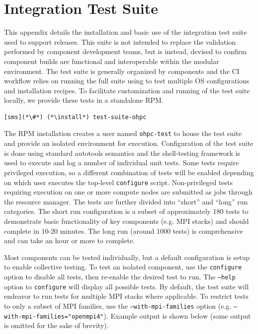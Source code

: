 \clearpage
\section{Integration Test Suite}  \label{appendix:test_suite}

This appendix details the installation and basic use of the integration test
suite used to support \OHPC{} releases. This suite is not intended to replace
the validation performed by component development teams, but is instead,
devised to confirm component builds are functional and interoperable within
the modular \OHPC{} environment.
The test suite is generally organized by components and the \OHPC{} CI workflow
relies on running the full suite using \href{https://jenkins.io}{\color{blue}{Jenkins}} to test
multiple OS configurations and installation recipes.
To facilitate customization and running of the test suite locally, we
provide these tests in a standalone RPM.

\begin{lstlisting}
[sms](*\#*) (*\install*) test-suite-ohpc
\end{lstlisting}

The RPM installation creates a user named \texttt{ohpc-test} to house the test
suite and provide an isolated environment for execution.  Configuration of the
test suite is done using standard \GNU{} autotools semantics and the
\href{https://jenkins.io}{\color{blue}{BATS}} shell-testing framework is used
to execute and log a number of individual unit tests.  Some tests require
privileged execution, so a different combination of tests will be enabled
depending on which user executes the top-level \texttt{configure}
script. Non-privileged tests requiring execution on one or more compute nodes are
submitted as jobs through the \rms{} resource manager. The tests are further
divided into ``short'' and ``long'' run categories. The short run configuration
is a subset
of approximately 180 tests to demonstrate basic functionality of key components
(e.g. MPI stacks) and should complete in 10-20 minutes. The long run (around
1000 tests) is comprehensive and can take an hour or more to complete.

Most components can be tested individually, but a default configuration is
setup to enable collective testing. To test an isolated component, use the
\texttt{configure} option to disable all tests, then re-enable the desired test
to run. The \texttt{--help} option to \texttt{configure} will display all
possible tests. By default, the test suite will endeavor to run tests for
multiple MPI stacks where applicable. To restrict tests to only a subset of MPI
families, use the \texttt{--with-mpi-families} option
(e.g. \texttt{--with-mpi-families="openmpi4"}). Example output is shown below
(some output is omitted for the sake of brevity).

